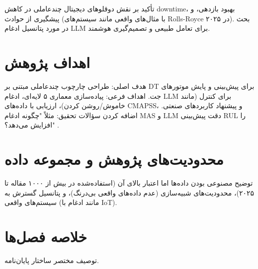 تأکید بر نقش دوقلوهای دیجیتال چندعاملی در کاهش downtime، بهبود بازدهی، و پیشگیری از حوادث (با مثال‌های واقعی مانند سیستم‌های Rolls-Royce در ۲۰۲۵). بحث در مورد پتانسیل ادغام LLM برای تعامل طبیعی و تصمیم‌گیری هوشمند.





\section{اهداف پژوهش}
هدف اصلی: طراحی چارچوب چندعاملی مبتنی بر DT برای پیش‌بینی و پایش موتورهای جت.
اهداف فرعی: پیاده‌سازی معماری ۵ لایه‌ای، ادغام LLM برای کنترل (مانند خاموش/روشن کردن)، ارزیابی با داده‌های CMAPSS، و پیشنهاد کاربردهای صنعتی.
اضافه کردن سؤالات تحقیق: مثلاً "چگونه ادغام MAS و LLM دقت پیش‌بینی RUL را افزایش می‌دهد؟"
 \cite{karimi2020soft, mohammadimohammadabadi}. 


\section{محدودیت‌های پژوهش و مجموعه داده }

توضیح مصنوعی بودن داده‌ها اما اعتبار بالای آن (استفاده‌شده در بیش از ۱۰۰۰ مقاله تا ۲۰۲۵)، محدودیت‌های شبیه‌سازی (عدم داده‌های واقعی بی‌درنگ)، و پتانسیل گسترش به سیستم‌های واقعی (مانند ادغام با IoT).

\section{خلاصه فصل‌ها}
توصیف مختصر ساختار پایان‌نامه.
